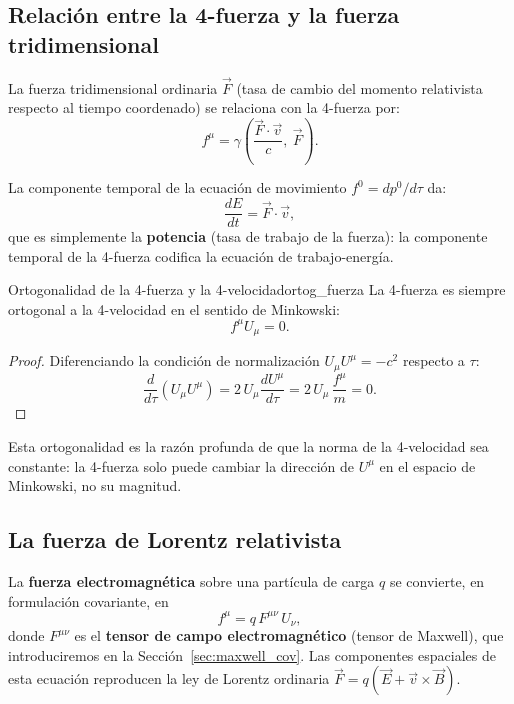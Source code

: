\subsection{Relación entre la 4-fuerza y la fuerza tridimensional}

La fuerza tridimensional ordinaria $\vec{F}$ (tasa de cambio del momento relativista respecto al tiempo coordenado) se relaciona con la 4-fuerza por:
\[
  f^\mu = \gamma\left(\frac{\vec{F}\cdot\vec{v}}{c},\ \vec{F}\right).
\]

La componente temporal de la ecuación de movimiento $f^0 = dp^0/d\tau$ da:
\begin{equation}
  \frac{dE}{dt} = \vec{F}\cdot\vec{v},
  \label{eq:potencia}
\end{equation}
que es simplemente la \textbf{potencia} (tasa de trabajo de la fuerza): la componente temporal de la 4-fuerza codifica la ecuación de trabajo-energía.

\begin{proposicion}{Ortogonalidad de la 4-fuerza y la 4-velocidad}{ortog_fuerza}
La 4-fuerza es siempre ortogonal a la 4-velocidad en el sentido de Minkowski:
\begin{equation}
  f^\mu U_\mu = 0.
  \label{eq:ortog_fuerza}
\end{equation}
\end{proposicion}

\begin{proof}
Diferenciando la condición de normalización $U_\mu U^\mu = -c^2$ respecto a $\tau$:
\[
  \frac{d}{d\tau}(U_\mu U^\mu) = 2\,U_\mu\frac{dU^\mu}{d\tau} = 2\,U_\mu\,\frac{f^\mu}{m} = 0.
\]
\end{proof}

Esta ortogonalidad es la razón profunda de que la norma de la 4-velocidad sea constante: la 4-fuerza solo puede cambiar la dirección de $U^\mu$ en el espacio de Minkowski, no su magnitud.

\subsection{La fuerza de Lorentz relativista}

La \textbf{fuerza electromagnética} sobre una partícula de carga $q$ se convierte, en formulación covariante, en
\begin{equation}
  f^\mu = q\,F^{\mu\nu}\,U_\nu,
  \label{eq:lorentz_cov}
\end{equation}
donde $F^{\mu\nu}$ es el \textbf{tensor de campo electromagnético} (tensor de Maxwell), que introduciremos en la Sección~\ref{sec:maxwell_cov}. Las componentes espaciales de esta ecuación reproducen la ley de Lorentz ordinaria $\vec{F} = q(\vec{E} + \vec{v}\times\vec{B})$.

